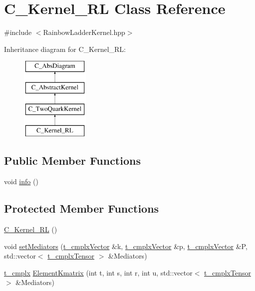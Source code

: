 \hypertarget{class_c___kernel___r_l}{\section{C\-\_\-\-Kernel\-\_\-\-R\-L Class Reference}
\label{class_c___kernel___r_l}
}


{\ttfamily \#include $<$Rainbow\-Ladder\-Kernel.\-hpp$>$}

Inheritance diagram for C\-\_\-\-Kernel\-\_\-\-R\-L\-:\begin{figure}[H]
\begin{center}
\leavevmode
\includegraphics[height=4.000000cm]{class_c___kernel___r_l}
\end{center}
\end{figure}
\subsection*{Public Member Functions}
\begin{DoxyCompactItemize}
\item 
void \hyperlink{class_c___kernel___r_l_a456dc18a4f961f9f3d8d1a51917eee8c}{info} ()
\end{DoxyCompactItemize}
\subsection*{Protected Member Functions}
\begin{DoxyCompactItemize}
\item 
\hyperlink{class_c___kernel___r_l_a408a220be8c7fe3b68ad3aacff037251}{C\-\_\-\-Kernel\-\_\-\-R\-L} ()
\item 
void \hyperlink{class_c___kernel___r_l_abb7217ca0b629a6d28f460f27b0b3306}{set\-Mediators} (\hyperlink{types_8h_ae8d0d77d0edff801ba45e425c85cf87d}{t\-\_\-cmplx\-Vector} \&k, \hyperlink{types_8h_ae8d0d77d0edff801ba45e425c85cf87d}{t\-\_\-cmplx\-Vector} \&p, \hyperlink{types_8h_ae8d0d77d0edff801ba45e425c85cf87d}{t\-\_\-cmplx\-Vector} \&P, std\-::vector$<$ \hyperlink{types_8h_a23430de2ae483000af45037b36fedba8}{t\-\_\-cmplx\-Tensor} $>$ \&Mediators)
\item 
\hyperlink{types_8h_aa75ae339052372f671bb263e6a272e82}{t\-\_\-cmplx} \hyperlink{class_c___kernel___r_l_a74a876dbb773d242c6264182c7949ca2}{Element\-Kmatrix} (int t, int s, int r, int u, std\-::vector$<$ \hyperlink{types_8h_a23430de2ae483000af45037b36fedba8}{t\-\_\-cmplx\-Tensor} $>$ \&Mediators)
\end{DoxyCompactItemize}
